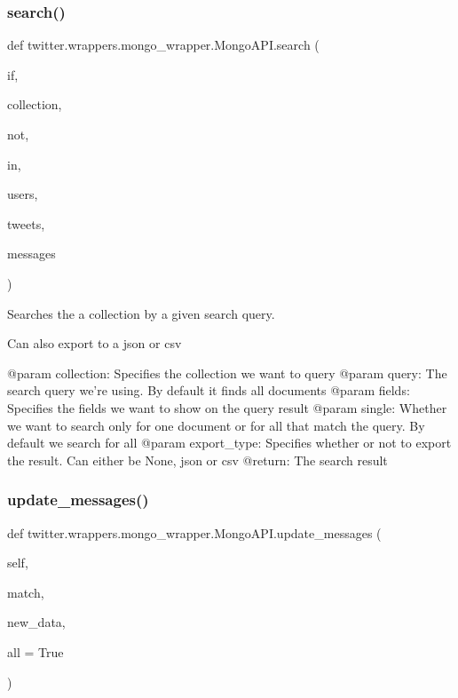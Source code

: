 \subsubsection{\texorpdfstring{search()}{search()}}
{\footnotesize\ttfamily def twitter.\+wrappers.\+mongo\+\_\+wrapper.\+Mongo\+A\+P\+I.\+search (\begin{DoxyParamCaption}\item[{}]{if,  }\item[{}]{collection,  }\item[{}]{not,  }\item[{}]{in,  }\item[{}]{users,  }\item[{}]{tweets,  }\item[{}]{messages }\end{DoxyParamCaption})}



Searches the a collection by a given search query. 

Can also export to a json or csv \begin{DoxyVerb}    @param collection: Specifies the collection we want to query
    @param query: The search query we're using. By default it finds all documents
    @param fields: Specifies the fields we want to show on the query result
    @param single: Whether we want to search only for one document or for all that match the query. By default
    we search for all
    @param export_type: Specifies whether or not to export the result. Can either be None, json or csv
    @return: The search result\end{DoxyVerb}
 \mbox{\label{classtwitter_1_1wrappers_1_1mongo__wrapper_1_1MongoAPI_a731dfdca8eac58b3b2b052e0a28bffcd}} 
\subsubsection{\texorpdfstring{update\+\_\+messages()}{update\_messages()}}
{\footnotesize\ttfamily def twitter.\+wrappers.\+mongo\+\_\+wrapper.\+Mongo\+A\+P\+I.\+update\+\_\+messages (\begin{DoxyParamCaption}\item[{}]{self,  }\item[{}]{match,  }\item[{}]{new\+\_\+data,  }\item[{}]{all = {\ttfamily True} }\end{DoxyParamCaption})}




